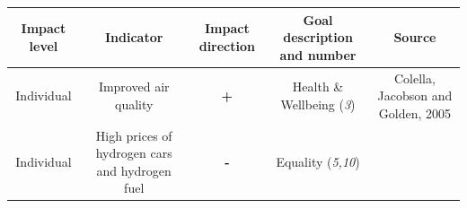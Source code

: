 \documentclass[
]{book}
\begin{document}
\begin{longtable}[]{@{}ccccc@{}}
\toprule
\begin{minipage}[b]{0.17\columnwidth}\centering
Impact level\strut
\end{minipage} & \begin{minipage}[b]{0.16\columnwidth}\centering
Indicator\strut
\end{minipage} & \begin{minipage}[b]{0.17\columnwidth}\centering
Impact direction\strut
\end{minipage} & \begin{minipage}[b]{0.17\columnwidth}\centering
Goal description and number\strut
\end{minipage} & \begin{minipage}[b]{0.17\columnwidth}\centering
Source\strut
\end{minipage}\tabularnewline
\midrule
\endhead
\begin{minipage}[t]{0.17\columnwidth}\centering
Individual\strut
\end{minipage} & \begin{minipage}[t]{0.16\columnwidth}\centering
Improved air quality\strut
\end{minipage} & \begin{minipage}[t]{0.17\columnwidth}\centering
\textbf{+}\strut
\end{minipage} & \begin{minipage}[t]{0.17\columnwidth}\centering
Health \& Wellbeing (\emph{3})\strut
\end{minipage} & \begin{minipage}[t]{0.17\columnwidth}\centering
Colella, Jacobson and Golden, 2005\strut
\end{minipage}\tabularnewline
\begin{minipage}[t]{0.17\columnwidth}\centering
Individual\strut
\end{minipage} & \begin{minipage}[t]{0.16\columnwidth}\centering
High prices of hydrogen cars and hydrogen fuel\strut
\end{minipage} & \begin{minipage}[t]{0.17\columnwidth}\centering
\textbf{-}\strut
\end{minipage} & \begin{minipage}[t]{0.17\columnwidth}\centering
Equality (\emph{5,10})\strut
\end{minipage} & \begin{minipage}[t]{0.17\columnwidth}\centering

\end{minipage}
\end{longtable}
\end{document}
